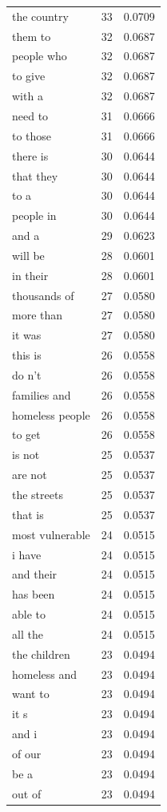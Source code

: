 \begin{tabular}{lrl}
the country & 33 & 0.0709 \\
them to & 32 & 0.0687 \\
people who & 32 & 0.0687 \\
to give & 32 & 0.0687 \\
with a & 32 & 0.0687 \\
need to & 31 & 0.0666 \\
to those & 31 & 0.0666 \\
there is & 30 & 0.0644 \\
that they & 30 & 0.0644 \\
to a & 30 & 0.0644 \\
people in & 30 & 0.0644 \\
and a & 29 & 0.0623 \\
will be & 28 & 0.0601 \\
in their & 28 & 0.0601 \\
thousands of & 27 & 0.0580 \\
more than & 27 & 0.0580 \\
it was & 27 & 0.0580 \\
this is & 26 & 0.0558 \\
do n't & 26 & 0.0558 \\
families and & 26 & 0.0558 \\
homeless people & 26 & 0.0558 \\
to get & 26 & 0.0558 \\
is not & 25 & 0.0537 \\
are not & 25 & 0.0537 \\
the streets & 25 & 0.0537 \\
that is & 25 & 0.0537 \\
most vulnerable & 24 & 0.0515 \\
i have & 24 & 0.0515 \\
and their & 24 & 0.0515 \\
has been & 24 & 0.0515 \\
able to & 24 & 0.0515 \\
all the & 24 & 0.0515 \\
the children & 23 & 0.0494 \\
homeless and & 23 & 0.0494 \\
want to & 23 & 0.0494 \\
it s & 23 & 0.0494 \\
and i & 23 & 0.0494 \\
of our & 23 & 0.0494 \\
be a & 23 & 0.0494 \\
out of & 23 & 0.0494 \\

\end{tabular}
